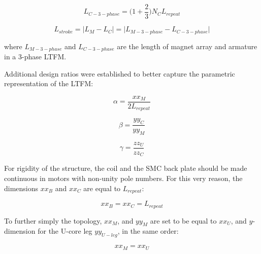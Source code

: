         
        \begin{equation}
            L_{C-3-phase} = \bigg(1+\frac{2}{3}\bigg) N_C L_{repeat} 
            \label{eq:chap/rsm/LTFM/L_C_3phase}
        \end{equation}
        
        
        \begin{equation}
            L_{stroke} = \big| L_M-L_C \big| = \big| L_{M-3-phase} - L_{C-3-phase} \big|
            \label{eq:chap/rsm/LTFM/L_stroke}
        \end{equation}
        
        
        where $L_{M-3-phase}$ and $L_{C-3-phase}$ are the length of magnet array and armature in a 3-phase \acs{LTFM}.

        
        
        Additional design ratios were established to better capture the parametric representation of the \acs{LTFM}:
        
        
        \begin{equation}
            \alpha=\frac{xx_M}{2 L_{repeat}}
            \label{eq:chap/rsm/LTFM/alpha}
        \end{equation}
        
        
        \begin{equation}
            \beta=\frac{yy_C}{yy_M}
            \label{eq:chap/rsm/LTFM/beta}
        \end{equation}
        
        
        \begin{equation}
            \gamma=\frac{zz_U}{zz_C}
            \label{eq:chap/rsm/LTFM/gamma}
        \end{equation}
        
        
        For rigidity of the structure, the coil and the SMC back plate should be made continuous in motors with non-unity pole numbers. For this very reason, the dimensions $xx_B$ and $xx_C$ are equal to $L_{repeat}$:
        
        
        \begin{equation}
            xx_B = xx_C = L_{repeat}
            \label{eq:chap/rsm/LTFM/xb is xc is lrepeat}
        \end{equation}
        
        
        To further simply the topology, $xx_M$, and $yy_M$ are set to be equal to $xx_U$, and $y$-dimension for the U-core leg $yy_{U-leg}$, in the same order:
        
        
        \begin{equation}
            xx_M=xx_U
            \label{eq:chap/rsm/LTFM/xm is xu}
        \end{equation}
        
